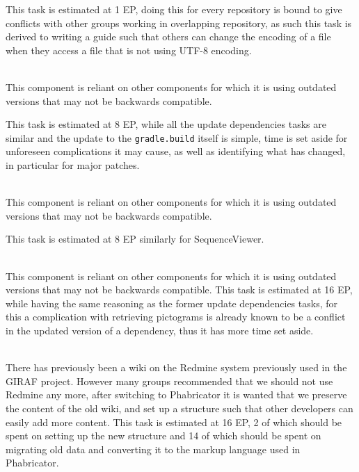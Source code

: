 \begin{description}[style=unboxed]
        This task is estimated at 1 EP, doing this for every repository is bound to give conflicts with other groups working in overlapping repository, as such this task is derived to writing a guide such that others can change the encoding of a file when they access a file that is not using UTF-8 encoding.
    \item[{[}\phigh{]} SequenceViewer - Update dependencies] \hfill \\
        This component is reliant on other components for which it is using outdated versions that may not be backwards compatible.

        This task is estimated at 8 EP, while all the update dependencies tasks are similar and the update to the \texttt{gradle.build} itself is simple, time is set aside for unforeseen complications it may cause, as well as identifying what has changed, in particular for major patches.
    \item[{[}\phigh{]} Sequence - Update dependencies] \hfill \\ 
        This component is reliant on other components for which it is using outdated versions that may not be backwards compatible.

        This task is estimated at 8 EP similarly for SequenceViewer.
    \item[{[}\phigh{]} Picto Search - Update dependencies] \hfill \\
        This component is reliant on other components for which it is using outdated versions that may not be backwards compatible.
        This task is estimated at 16 EP, while having the same reasoning as the former update dependencies tasks, for this a complication with retrieving pictograms is already known to be a conflict in the updated version of a dependency, thus it has more time set aside.
    \item[{[}\phigh{]} Wiki - Setup new structure and migrate to Phabricator] \hfill \\
        There has previously been a wiki on the Redmine system previously used in the GIRAF project. 
        However many groups recommended that we should not use Redmine any more, after switching to Phabricator it is wanted that we preserve the content of the old wiki, and set up a structure such that other developers can easily add more content.
        This task is estimated at 16 EP, 2 of which should be spent on setting up the new structure and 14 of which should be spent on migrating old data and converting it to the markup language used in Phabricator. 


\end{description}
